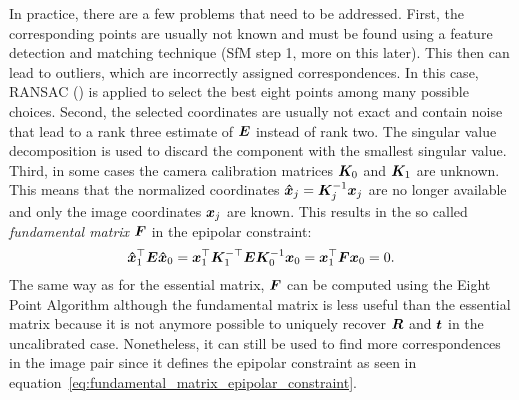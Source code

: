			In practice, there are a few problems that need to be addressed.
			First, the corresponding points are usually not known and must be found using a feature detection and matching technique (SfM step 1, more on this later).
			This then can lead to outliers, which are incorrectly assigned correspondences.
			In this case, {RANSAC} (\cite{fischler1981random}) is applied to select the best eight points among many possible choices.
			Second, the selected coordinates are usually not exact and contain noise that lead to a rank three estimate of $\bm{E}$ instead of rank two.
			The singular value decomposition is used to discard the component with the smallest singular value.
			Third, in some cases the camera calibration matrices $\bm{K}_0$ and $\bm{K}_1$ are unknown.
			This means that the normalized coordinates $\bm{\hat{x}}_j = \bm{K}_j^{-1} \bm{x}_j$ are no longer available and only the image coordinates $\bm{x}_j$ are known.
			This results in the so called \emph{fundamental matrix} $\bm{F}$ in the epipolar constraint:
			\begin{equation}\label{eq:fundamental_matrix_epipolar_constraint}
				\bm{\hat{x}}_1^\top \bm{E} \bm{\hat{x}}_0 = 
				\bm{x}_1^\top \bm{K}_1^{-\top} \bm{E} \bm{K}_0^{-1} \bm{x}_0 = 
				\bm{x}_1^\top \bm{F} \bm{x}_0 = 0.
			\end{equation}
			The same way as for the essential matrix, $\bm{F}$ can be computed using the Eight Point Algorithm although the fundamental matrix is less useful than the essential matrix because it is not anymore possible to uniquely recover $\bm{R}$ and $\bm{t}$ in the uncalibrated case.
			Nonetheless, it can still be used to find more correspondences in the image pair since it defines the epipolar constraint as seen in equation~\ref{eq:fundamental_matrix_epipolar_constraint}.
			
			
